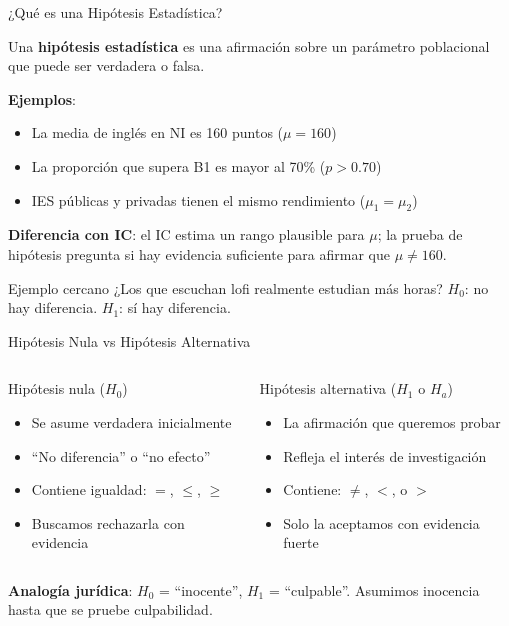 \documentclass[aspectratio=169, 11pt]{beamer}
\begin{document}
\begin{frame}{¿Qué es una Hipótesis Estadística?}
\begin{definition}
Una \textbf{hipótesis estadística} es una afirmación sobre un parámetro poblacional que puede ser verdadera o falsa.
\end{definition}

\vspace{0.2cm}
\textbf{Ejemplos}:
\begin{itemize}
  \item La media de ingl\'es en NI es 160 puntos ($\mu = 160$)
  \item La proporci\'on que supera B1 es mayor al 70\% ($p > 0.70$)
  \item IES p\'ublicas y privadas tienen el mismo rendimiento ($\mu_1 = \mu_2$)
\end{itemize}

\vspace{0.1cm}
\textbf{Diferencia con IC}: el IC estima un rango plausible para $\mu$; la prueba de hip\'otesis pregunta si hay evidencia suficiente para afirmar que $\mu \neq 160$.

\begin{exampleblock}{Ejemplo cercano}
¿Los que escuchan lofi realmente estudian m\'as horas? $H_0$: no hay diferencia. $H_1$: s\'i hay diferencia.
\end{exampleblock}
\end{frame}

\begin{frame}{Hipótesis Nula vs Hipótesis Alternativa}
\begin{columns}[T]
\begin{block}{Hipótesis nula ($H_0$)}
\begin{itemize}
  \item Se asume verdadera inicialmente
  \item ``No diferencia'' o ``no efecto''
  \item Contiene igualdad: $=$, $\leq$, $\geq$
  \item Buscamos \alert{rechazarla} con evidencia
\end{itemize}
\end{block}

\begin{block}{Hipótesis alternativa ($H_1$ o $H_a$)}
\begin{itemize}
  \item La afirmación que queremos probar
  \item Refleja el interés de investigación
  \item Contiene: $\neq$, $<$, o $>$
  \item Solo la aceptamos con \alert{evidencia fuerte}
\end{itemize}
\end{block}
\end{columns}

\vspace{0.3cm}
\textbf{Analogía jurídica}: $H_0$ = ``inocente'', $H_1$ = ``culpable''. Asumimos inocencia hasta que se pruebe culpabilidad.
\end{frame}
\end{document}
